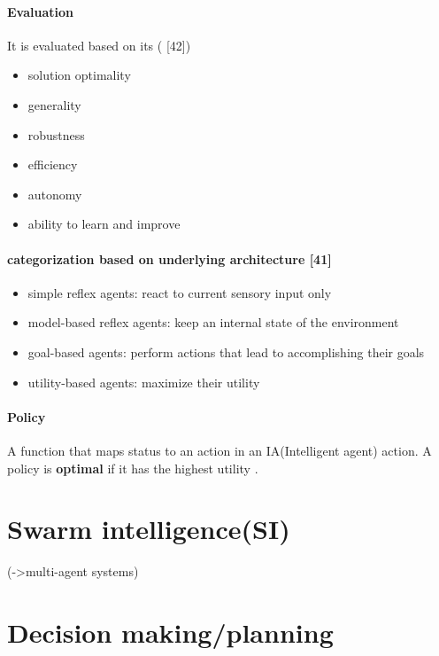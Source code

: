\documentclass{article}
\begin{document}
	 \paragraph{Evaluation}
		  It is evaluated based on its (\citet{rizk-2018-decision-making-in-multiagent-systems-a-survey} [42])
		 \begin{itemize}
		 	\item solution optimality
		 	\item generality
		 	\item robustness
		 	\item efficiency
		 	\item autonomy
		 	\item ability to learn and improve
		 \end{itemize}
	  
	  \paragraph{categorization based on underlying architecture \citet{rizk-2018-decision-making-in-multiagent-systems-a-survey} [41]}
		 \begin{itemize}
		 	\item simple reflex agents:  react to current sensory input only 
		 	\item model-based reflex agents: keep an internal state of the environment
		 	\item goal-based agents:  perform actions that lead to accomplishing their goals
		 	\item utility-based agents:  maximize their utility
		 \end{itemize}
	 
	 \paragraph{Policy} A function that maps status to an action in an IA(Intelligent agent) action.  A policy is \textbf{optimal} if it has the highest utility \citep{rizk-2018-decision-making-in-multiagent-systems-a-survey}. 
	 
	 \section{Swarm intelligence(SI)} 
	  (->multi-agent systems)
	 
	 \section{Decision making/planning}
\end{document}
